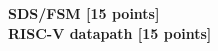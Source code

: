 \documentclass[addpoints, 12pt]{exam}
\begin{document}
\begin{questions}

\question[15] \textbf{SDS/FSM [15 points]}\\


\question[15] \textbf{RISC-V datapath [15 points]}\\


\end{questions}
\end{document}
